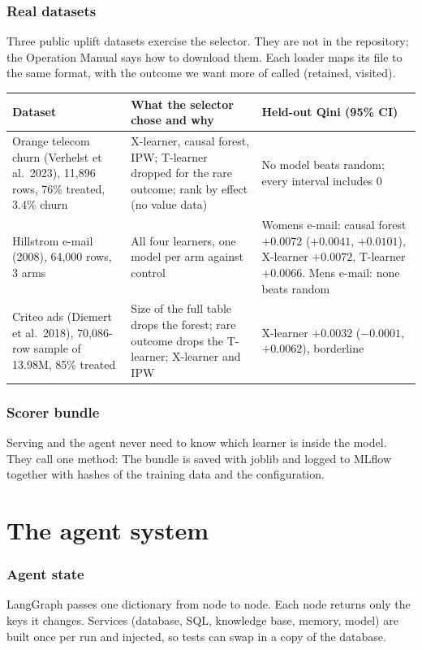 \documentclass[11pt]{article}
\begin{document}
\section{Real datasets}
\label{sec:real}
Three public uplift datasets exercise the selector. They are not in the repository; the Operation Manual says how to download them. Each loader maps its file to the same format, with the outcome we want more of called  (retained, visited).

\begin{tabularx}{\textwidth}{@{}lLL@{}}
\toprule
Dataset & What the selector chose and why & Held-out Qini (95\% CI) \\
\midrule
Orange telecom churn (Verhelst et al.\ 2023), 11{,}896 rows, 76\% treated, 3.4\% churn & X-learner, causal forest, IPW; T-learner dropped for the rare outcome; rank by effect (no value data) & No model beats random; every interval includes 0 \\
Hillstrom e-mail (2008), 64{,}000 rows, 3 arms & All four learners, one model per arm against control & Womens e-mail: causal forest $+0.0072$ ($+0.0041$, $+0.0101$), X-learner $+0.0072$, T-learner $+0.0066$. Mens e-mail: none beats random \\
Criteo ads (Diemert et al.\ 2018), 70{,}086-row sample of 13.98M, 85\% treated & Size of the full table drops the forest; rare outcome drops the T-learner; X-learner and IPW & X-learner $+0.0032$ ($-0.0001$, $+0.0062$), borderline \\
\bottomrule
\end{tabularx}

\section{Scorer bundle}
\label{sec:scorer}
Serving and the agent never need to know which learner is inside the model. They call one method:
The bundle is saved with joblib and logged to MLflow together with hashes of the training data and the configuration.

\part{The agent system}

\section{Agent state}
\label{sec:state}
LangGraph passes one dictionary from node to node. Each node returns only the keys it changes. Services (database, SQL, knowledge base, memory, model) are built once per run and injected, so tests can swap in a copy of the database.
\end{document}
